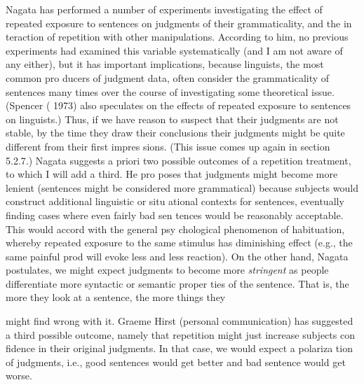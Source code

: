 \begin{styleStandard}
Nagata has performed a number of experiments investigating the effect of repeated exposure to sentences on judgments of their grammaticality, and the in\- teraction of repetition with other manipulations. According to him, no previous experiments had examined this variable systematically (and I am not aware of any either), but it has important implications, because linguists, the most common pro\- ducers of judgment data, often consider the grammaticality of sentences many times over the course of investigating some theoretical issue. (Spencer ( 1973) also speculates on the effects of repeated exposure to sentences on linguists.) Thus, if we have reason to suspect that their judgments are not stable, by the time they draw their conclusions their judgments might be quite different from their first impres\- sions. (This issue comes up again in section 5.2.7.) Nagata suggests a priori two possible outcomes of a repetition treatment, to which I will add a third. He pro\- poses that judgments might become more lenient (sentences might be considered more grammatical) because subjects would construct additional linguistic or situ\- ational contexts for sentences, eventually finding cases where even fairly bad sen\- tences would be reasonably acceptable. This would accord with the general psy\- chological phenomenon of habituation, whereby repeated exposure to the same stimulus has diminishing effect (e.g., the same painful prod will evoke less and less reaction). On the other hand, Nagata postulates, we might expect judgments to become more \textit{stringent}\textit{ }as people differentiate more syntactic or semantic proper\- ties of the sentence. That is, the more they look at a sentence, the more things they
\end{styleStandard}


\clearpage\setcounter{page}{1}\begin{styleStandard}
might find wrong with it. Graeme Hirst (personal communication) has suggested a third possible outcome, namely that repetition might just increase subjects{\textquotesingle} con\- fidence in their original judgments. In that case, we would expect a polariza\- tion of judgments, i.e., good sentences would get better and bad sentence would get worse.
\end{styleStandard}


